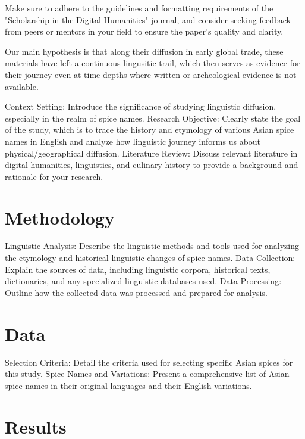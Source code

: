 \documentclass{dsh} %
\begin{document}
Make sure to adhere to the guidelines and formatting requirements of the "Scholarship in the Digital Humanities" journal, and consider seeking feedback from peers or mentors in your field to ensure the paper's quality and clarity.










Our main hypothesis is that along their diffusion in early global trade, these materials have left a continuous lingusitic trail, which then serves as evidence for their journey even at time-depths where written or archeological evidence is not available.



Context Setting: Introduce the significance of studying linguistic diffusion, especially in the realm of spice names.
Research Objective: Clearly state the goal of the study, which is to trace the history and etymology of various Asian spice names in English and analyze how linguistic journey informs us about physical/geographical diffusion.
Literature Review: Discuss relevant literature in digital humanities, linguistics, and culinary history to provide a background and rationale for your research.

\section{Methodology}

Linguistic Analysis: Describe the linguistic methods and tools used for analyzing the etymology and historical linguistic changes of spice names.
Data Collection: Explain the sources of data, including linguistic corpora, historical texts, dictionaries, and any specialized linguistic databases used.
Data Processing: Outline how the collected data was processed and prepared for analysis.

\section{Data}

Selection Criteria: Detail the criteria used for selecting specific Asian spices for this study.
Spice Names and Variations: Present a comprehensive list of Asian spice names in their original languages and their English variations.

\section{Results}
\end{document}
